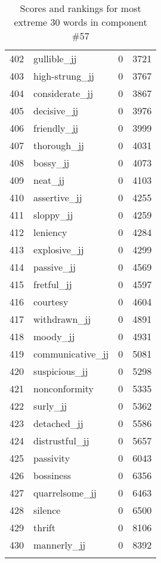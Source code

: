 \begin{longtable}[!htbp]{| rlr@{.}l |}
    402 & gullible\_jj & 0 & 3721 \\
    403 & high-strung\_jj & 0 & 3767 \\
    404 & considerate\_jj & 0 & 3867 \\
    405 & decisive\_jj & 0 & 3976 \\
    406 & friendly\_jj & 0 & 3999 \\
    407 & thorough\_jj & 0 & 4031 \\
    408 & bossy\_jj & 0 & 4073 \\
    409 & neat\_jj & 0 & 4103 \\
    410 & assertive\_jj & 0 & 4255 \\
    411 & sloppy\_jj & 0 & 4259 \\
    412 & leniency & 0 & 4284 \\
    413 & explosive\_jj & 0 & 4299 \\
    414 & passive\_jj & 0 & 4569 \\
    415 & fretful\_jj & 0 & 4597 \\
    416 & courtesy & 0 & 4604 \\
    417 & withdrawn\_jj & 0 & 4891 \\
    418 & moody\_jj & 0 & 4931 \\
    419 & communicative\_jj & 0 & 5081 \\
    420 & suspicious\_jj & 0 & 5298 \\
    421 & nonconformity & 0 & 5335 \\
    422 & surly\_jj & 0 & 5362 \\
    423 & detached\_jj & 0 & 5586 \\
    424 & distrustful\_jj & 0 & 5657 \\
    425 & passivity & 0 & 6043 \\
    426 & bossiness & 0 & 6356 \\
    427 & quarrelsome\_jj & 0 & 6463 \\
    428 & silence & 0 & 6500 \\
    429 & thrift & 0 & 8106 \\
    430 & mannerly\_jj & 0 & 8392 \\
    \hline
    \caption{Scores and rankings for most extreme 30 words in component \#57} \\
\end{longtable}
